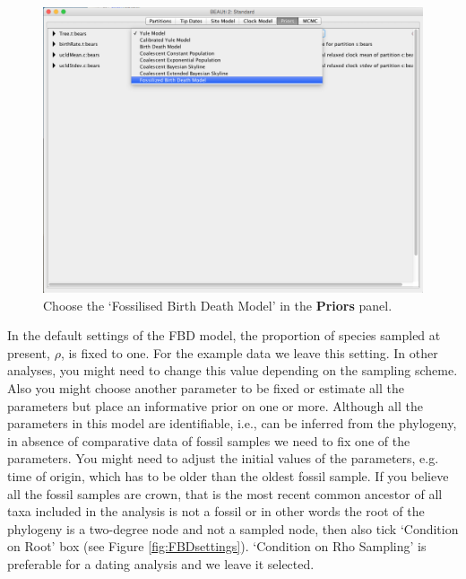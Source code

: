 \documentclass[12pt]{article}
\begin{document}
\begin{figure}	
\centering
\includegraphics[width=\textwidth]{figures/FBDmodel}
\caption{Choose the `Fossilised Birth Death Model' in the {\bf Priors} panel. \label{fig:FBDmodel}}
\label{fig:BEAUti_ImportNexus}
\end{figure}

In the default settings of the FBD model, the proportion of species sampled at present, $\rho$, is fixed to one. For the example data we leave this setting. In other analyses, you might need to change this value depending on the sampling scheme. Also you might choose another parameter to be fixed or estimate all the parameters but place an informative prior on one or more. Although all the parameters in this model are identifiable, i.e., can be inferred from the phylogeny, in absence of comparative data of fossil samples we need to fix one of the parameters.  You might need to adjust the initial values of the parameters, e.g. time of origin, which has to be older than the oldest fossil sample. If you believe all the fossil samples are crown, that is the most recent common ancestor of all taxa included in the analysis is not a fossil or in other words the root of the phylogeny is a two-degree node and not a sampled node, then also tick `Condition on Root' box (see Figure \ref{fig:FBDsettings}). `Condition on Rho Sampling' is preferable for a dating analysis and we leave it selected. 
\end{document}

